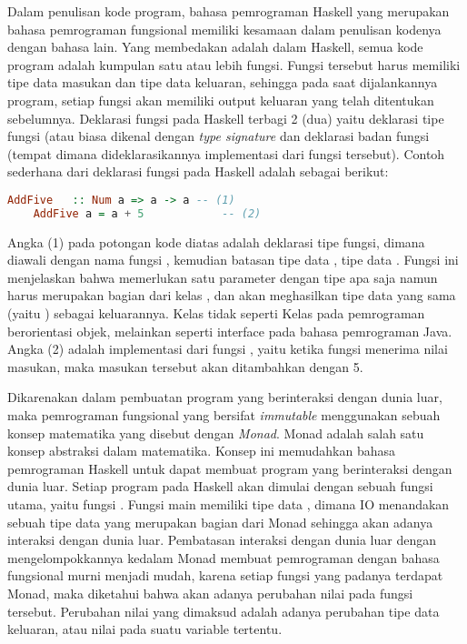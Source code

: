 \documentclass[pi.tex]{subfile}
\begin{document}
\hspace{11pt}Dalam penulisan kode program, bahasa pemrograman Haskell yang merupakan bahasa pemrograman fungsional memiliki kesamaan dalam penulisan kodenya dengan bahasa lain. Yang membedakan adalah dalam Haskell, semua kode program adalah kumpulan satu atau lebih fungsi. Fungsi tersebut harus memiliki tipe data masukan dan tipe data keluaran, sehingga pada saat dijalankannya program, setiap fungsi akan memiliki output keluaran yang telah ditentukan sebelumnya. Deklarasi fungsi pada Haskell terbagi 2 (dua) yaitu deklarasi tipe fungsi (atau biasa dikenal dengan \emph{type signature} dan deklarasi badan fungsi (tempat dimana dideklarasikannya implementasi dari fungsi tersebut). Contoh sederhana dari deklarasi fungsi pada Haskell adalah sebagai berikut:\\
  \begin{lstlisting}[language=Haskell]
    AddFive   :: Num a => a -> a -- (1)
    AddFive a = a + 5            -- (2)
  \end{lstlisting}
  
  \hspace{10pt}Angka (1) pada potongan kode diatas adalah deklarasi tipe fungsi, dimana diawali dengan nama fungsi , kemudian batasan tipe data , tipe data . Fungsi ini menjelaskan bahwa  memerlukan satu parameter dengan tipe apa saja namun harus merupakan bagian dari kelas , dan akan meghasilkan tipe data yang sama (yaitu ) sebagai keluarannya. Kelas  tidak seperti Kelas pada pemrograman berorientasi objek, melainkan seperti interface pada bahasa pemrograman Java.
  Angka (2) adalah implementasi dari fungsi , yaitu ketika fungsi menerima nilai masukan, maka masukan tersebut akan ditambahkan dengan 5.

  \hspace{10pt}Dikarenakan dalam pembuatan program yang berinteraksi dengan dunia luar, maka pemrograman fungsional yang bersifat \emph{immutable} menggunakan sebuah konsep matematika yang disebut dengan \emph{Monad}. Monad adalah salah satu konsep abstraksi dalam matematika. Konsep ini memudahkan bahasa pemrograman Haskell untuk dapat membuat program yang berinteraksi dengan dunia luar. Setiap program pada Haskell akan dimulai dengan sebuah fungsi utama, yaitu fungsi . Fungsi main memiliki tipe data , dimana IO menandakan sebuah tipe data yang merupakan bagian dari Monad sehingga akan adanya interaksi dengan dunia luar. Pembatasan interaksi dengan dunia luar dengan mengelompokkannya kedalam Monad membuat pemrograman dengan bahasa fungsional murni menjadi mudah, karena setiap fungsi yang padanya terdapat Monad, maka diketahui bahwa akan adanya perubahan nilai pada fungsi tersebut. Perubahan nilai yang dimaksud adalah adanya perubahan tipe data keluaran, atau nilai pada suatu variable tertentu.
\end{document}
